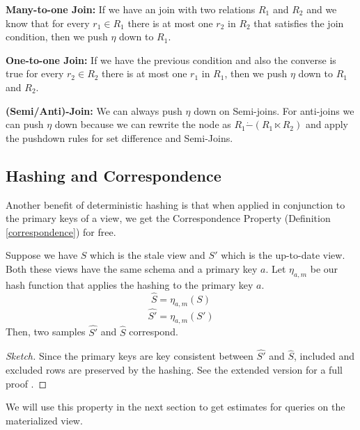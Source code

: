 \textbf{Many-to-one Join: } If we have an join with two relations $R_1$ and $R_2$ and we know that for every $r_1 \in R_1$ there is at most one $r_2$ in $R_2$ that satisfies the join condition, then we push $\eta$ down to $R_1$.

\textbf{One-to-one Join: } If we have the previous condition and also the converse is true for every $r_2 \in R_2$ there is at most one $r_1$ in $R_1$, then we push $\eta$ down to $R_1$ and $R_2$.

\textbf{(Semi/Anti)-Join: } We can always push $\eta$ down on Semi-joins. For anti-joins we can push $\eta$ down because we can rewrite the node as $R_1 \dot{-} (R_1 \ltimes R_2) $ and apply the pushdown rules for set difference and Semi-Joins.

\subsection{Hashing and Correspondence}
Another benefit of deterministic hashing is that when applied in conjunction to the primary keys of a view, we get the Correspondence Property (Definition \ref{correspondence}) for free.
\begin{proposition}
Suppose we have $S$ which is the stale view and $S'$ which is the up-to-date view.
Both these views have the same schema and a primary key $a$.
Let $\eta_{a, m}$ be our hash function that applies the hashing to the primary key $a$.
\[
\hat{S} = \eta_{a, m}(S)
\]
\[
\hat{S'} = \eta_{a, m}(S')
\]
Then, two samples $\hat{S'}$ and $\hat{S}$ correspond.
\end{proposition}
\begin{proof}[Sketch]
Since the primary keys are key consistent between $\hat{S'}$ and $\hat{S}$, included and excluded rows are preserved by the hashing.
See the extended version for a full proof .

\end{proof}
We will use this property in the next section to get estimates for queries on the materialized view.

